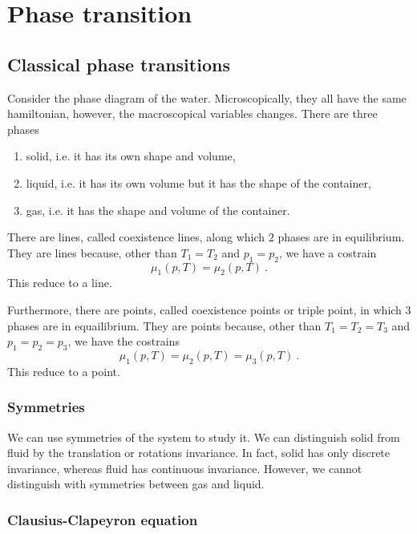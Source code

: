 \part{Phase transition}

\chapter{Classical phase transitions}

    Consider the phase diagram of the water. Microscopically, they all have the same hamiltonian, however, the macroscopical variables changes. There are three phases 
    \begin{enumerate}
        \item solid, i.e. it has its own shape and volume, 
        \item liquid, i.e. it has its own volume but it has the shape of the container,
        \item gas, i.e. it has the shape and volume of the container. 
    \end{enumerate}
    There are lines, called coexistence lines, along which $2$ phases are in equilibrium. They are lines because, other than $T_1 = T_2$ and $p_1 = p_2$, we have a costrain 
    \begin{equation*}
        \mu_1(p, T) = \mu_2 (p, T) ~.
    \end{equation*}
    This reduce to a line. 

    Furthermore, there are points, called coexistence points or triple point, in which $3$ phases are in equailibrium. They are points because, other than $T_1 = T_2 = T_3$ and $p_1 = p_2 = p_3$, we have the costrains
    \begin{equation*}
        \mu_1(p, T) = \mu_2 (p, T) = \mu_3 (p, T) ~.
    \end{equation*}
    This reduce to a point.
    
\section{Symmetries} 

    We can use symmetries of the system to study it. We can distinguish solid from fluid by the translation or rotations invariance. In fact, solid has only discrete invariance, whereas fluid has continuous invariance. However, we cannot distinguish with symmetries between gas and liquid.

\section{Clausius-Clapeyron equation}


